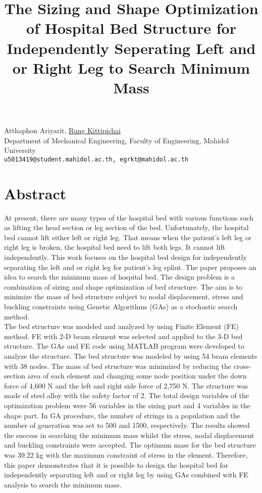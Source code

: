 \title{The Sizing and Shape Optimization of Hospital Bed Structure for Independently Seperating Left and or Right Leg to Search Minimum Mass}
\author{} \institute{}
\maketitle

\begin{center}
{\large Atthaphon Ariyarit, \underline{Rung Kittipichai}}\\
Department of Mechanical Engineering, Faculty of Engineering, Mahidol University\\
{\tt u5013419@student.mahidol.ac.th, egrkt@mahidol.ac.th}\\
\end{center}

\section*{Abstract}
At present, there are many types of the hospital bed with various functions such as lifting the head section or leg section of the bed. Unfortunately, the hospital bed cannot lift either left or right leg. That means when the patient's left leg or right leg is broken, the hospital bed need to lift both legs. It cannot lift independently.  This work focuses on the hospital bed design for independently separating the left and or right leg  for patient's leg splint. The paper proposes an idea to search the minimum mass of hospital bed. The design problem is a combination of sizing and shape optimization of bed structure. The aim is to minimize the mass of bed structure subject to nodal displacement, stress and buckling constraints using Genetic Algorithms (GAs) as a stochastic search method.\\
The bed structure was modeled and analyzed by using Finite Element (FE) method. FE with 2-D beam element was selected and applied to the 3-D bed structure. The GAs and FE code using MATLAB program were developed to analyze the structure. The bed structure was modeled by using 54 beam elements with 38 nodes. The mass of bed structure was minimized by reducing the cross-section area of each element and changing some node position under the down force of 4,600 N and the left and right side force of 2,750 N. The structure was made of steel alloy with the safety factor of 2. The total design variables of the optimization problem were 56 variables in the sizing part and 4 variables in the shape part.  In GA procedure, the number of strings in a population and the number of generation was set to 500 and 1500, respectively. The results showed the success in searching the minimum mass whilst the stress, nodal displacement and buckling constraints were accepted. The optimum mass for the bed structure was 39.22 kg with the maximum constraint of stress in the element. Therefore, this paper demonstrates that it is possible to design the hospital bed for independently separating left and or right leg by using GAs combined with FE analysis to search the minimum mass. 

